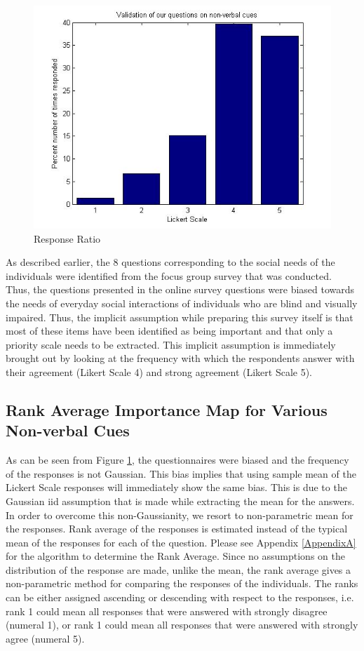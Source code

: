 \documentclass[oneside,11pt]{memoir}
\begin{document}
\begin{figure}
\begin{center}
\includegraphics[width=5in]{responseratio.jpg}
\caption{Response Ratio}
\label{Fig:Figure7}
\end{center}
\end{figure}

As described earlier, the 8 questions corresponding to the social needs of the individuals were identified from the focus group survey that was conducted. Thus, the questions presented in the online survey questions were biased towards the needs of everyday social interactions of individuals who are blind and visually impaired. Thus, the implicit assumption while preparing this survey itself is that most of these items have been identified as being important and that only a priority scale needs to be extracted. This implicit assumption is immediately brought out by looking at the frequency with which the respondents answer with their agreement (Likert Scale 4) and strong agreement (Likert Scale 5).

\subsection{Rank Average Importance Map for Various Non-verbal Cues}
As can be seen from Figure \ref{Fig:Figure7}, the questionnaires were biased and the frequency of the responses is not Gaussian. This bias implies that using sample mean of the Lickert Scale responses will immediately show the same bias. This is due to the Gaussian iid assumption that is made while extracting the mean for the answers. In order to overcome this non-Gaussianity, we resort to non-parametric mean for the responses. Rank average of the responses is estimated instead of the typical mean of the responses for each of the question. Please see Appendix \ref{AppendixA} for the algorithm to determine the Rank Average. Since no assumptions on the distribution of the response are made, unlike the mean, the rank average gives a non-parametric method for comparing the responses of the individuals. The ranks can be either assigned ascending or descending with respect to the responses, i.e. rank 1 could mean all responses that were answered with strongly disagree (numeral 1), or rank 1 could mean all responses that were answered with strongly agree (numeral 5).
\end{document}
